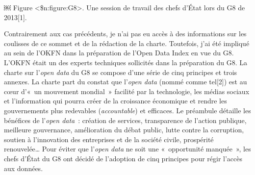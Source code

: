 \documentclass[]{book}
\theoremstyle{definition}
\theoremstyle{definition}
\theoremstyle{definition}
\theoremstyle{remark}
\begin{document}
￼ Figure \textless{}\$n:figure:G8\textgreater{}. Une session de travail
des chefs d'État lors du G8 de 2013{[}1{]}.

Contrairement aux cas précédents, je n'ai pas eu accès à des
informations sur les coulisses de ce sommet et de la rédaction de la
charte. Toutefois, j'ai été impliqué au sein de l'OKFN dans la
préparation de l'Open Data Index en vue du G8. L'OKFN était un des
experts techniques sollicités dans la préparation du G8. La charte sur
l'\emph{open data} du G8 se compose d'une série de cinq principes et
trois annexes. La charte part du constat que l'\emph{open data} (nommé
comme tel{[}2{]}) est au cœur d'«~un mouvement mondial~» facilité par la
technologie, les médias sociaux et l'information qui pourra créer de la
croissance économique et rendre les gouvernements plus redevables
(\emph{accountable}) et efficaces. Le préambule détaille les bénéfices
de l'\emph{open data}~: création de services, transparence de l'action
publique, meilleure gouvernance, amélioration du débat public, lutte
contre la corruption, soutien à l'innovation des entreprises et de la
société civile, prospérité renouvelée\ldots{} Pour éviter que
l'\emph{open data} ne soit une «~opportunité manquée~», les chefs d'État
du G8 ont décidé de l'adoption de cinq principes pour régir l'accès aux
données.
\end{document}
